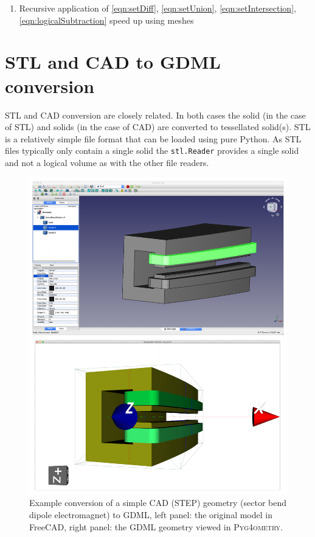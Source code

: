 \documentclass[final,5p,times,twocolumn]{elsarticle}
\newcommand{\pyinline}[1]{\lstinline[postbreak={}]{#1}}
\newcommand{\PYGEOMETRY}{\textsc{Pyg4ometry}}
\begin{document}
\begin{enumerate}
\item Recursive application of \ref{eqn:setDiff}, \ref{eqn:setUnion}, \ref{eqn:setIntersection}, \ref{eqn:logicalSubtraction} speed up using meshes
\end{enumerate}

\section{STL and CAD to GDML conversion}
STL and CAD conversion are closely related. In both cases the solid 
(in the case of STL) and solids (in the case of CAD) are converted to 
tessellated solid(s). STL is a relatively simple file format that can
be loaded using pure Python. As STL files typically only contain a single 
solid the \pyinline{stl.Reader} provides a single solid and not a logical volume
as with the other file readers.
%
\begin{figure}
\begin{center}
\includegraphics[width=0.9\columnwidth]{./model-scene/SectorBend.pdf}
\caption{Example conversion of a simple CAD (STEP) geometry (sector bend dipole electromagnet) to GDML, left panel:  
the original model in FreeCAD, right panel: the GDML geometry 
viewed in \PYGEOMETRY{}. }
\label{fig:cad-gdml}
\end{center}
\end{figure}
\end{document}
